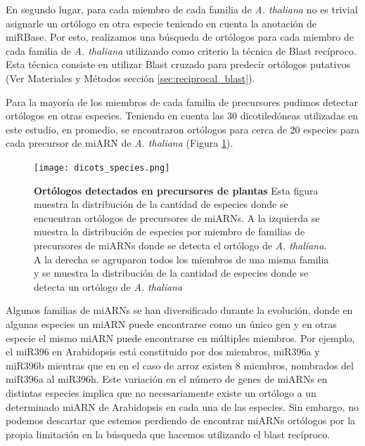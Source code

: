 En segundo lugar, para cada miembro de cada familia de \textit{A. thaliana} no es trivial asignarle un ortólogo en otra especie teniendo en cuenta la anotación de miRBase.
Por esto, realizamos una búsqueda de ortólogos para cada miembro de cada familia de \textit{A. thaliana} utilizando como criterio la técnica de Blast recíproco.
Esta técnica consiste en utilizar Blast cruzado para predecir ortólogos putativos (Ver Materiales y Métodos sección \ref{sec:reciprocal_blast}).

Para la mayoría de los miembros de cada familia de precursores pudimos detectar ortólogos en otras especies. 
Teniendo en cuenta las 30 dicotiledóneas utilizadas en este estudio, en promedio, se encontraron ortólogos para cerca de 20 especies para cada precursor de miARN de \textit{A. thaliana} (Figura \ref{fig:dicots_species}).

\begin{figure}[htbp!]
    \centering    
    \texttt{[image: dicots\_species.png]}
    \caption[Ortólogos detectados en precursores de plantas]{
    \textbf{Ortólogos detectados en precursores de plantas}
    Esta figura muestra la distribución de la cantidad de especies donde se encuentran ortólogos de precursores de miARNs.
    A la izquierda se muestra la distribución de especies por miembro de familias de precursores de miARNs donde se detecta el ortólogo de \textit{A. thaliana}.
    A la derecha se agruparon todos los miembros de una misma familia y se muestra la distribución de la cantidad de especies donde se detecta un ortólogo de \textit{A. thaliana}
    }
    \label{fig:dicots_species}
\end{figure}

Algunos familias de miARNs se han diversificado durante la evolución, donde en algunas especies un miARN puede encontrarse como un único gen y en otras especie el mismo miARN puede encontrarse en múltiples miembros.
Por ejemplo, el miR396 en Arabidopsis está constituido por dos miembros, miR396a y miR396b mientras que en en el caso de arroz existen 8 miembros, nombrados del miR396a al miR396h.
Este variación en el número de genes de miARNs en distintas especies implica que no necesariamente existe un ortólogo a un determinado miARN de Arabidopsis en cada una de las especies.
Sin embargo, no podemos descartar que estemos perdiendo de encontrar miARNs ortólogos por la propia limitación en la búsqueda que hacemos utilizando el blast recíproco.


